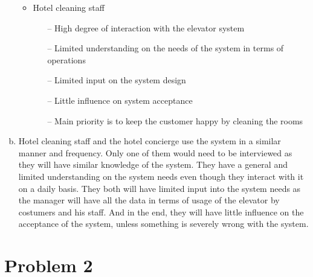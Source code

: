 \documentclass{article}
\begin{document}
\begin{enumerate}[(a)]
\begin{itemize}
		\item Hotel cleaning staff
			\begin{enumerate}
				\item[--] High degree of interaction with the elevator system
				\item[--] Limited understanding on the needs of the system in terms of operations
				\item[--] Limited input on the system design
				\item[--] Little influence on system acceptance
				\item[--] Main priority is to keep the customer happy by cleaning the rooms    
			\end{enumerate}
	
	\end{itemize}

\item Hotel cleaning staff and the hotel concierge use the system in a similar manner and frequency. 
Only one of them would need to be interviewed as they will have similar knowledge of the system.
They have a general and limited understanding on the system needs even though they interact with it 
on a daily basis. They both will have limited input into the system needs as the manager will have all
the data in terms of usage of the elevator by costumers and his staff. And in the end, they will have little
influence on the acceptance of the system, unless something is severely wrong with the system. 

\end{enumerate}

\section*{Problem 2}
\end{document}
